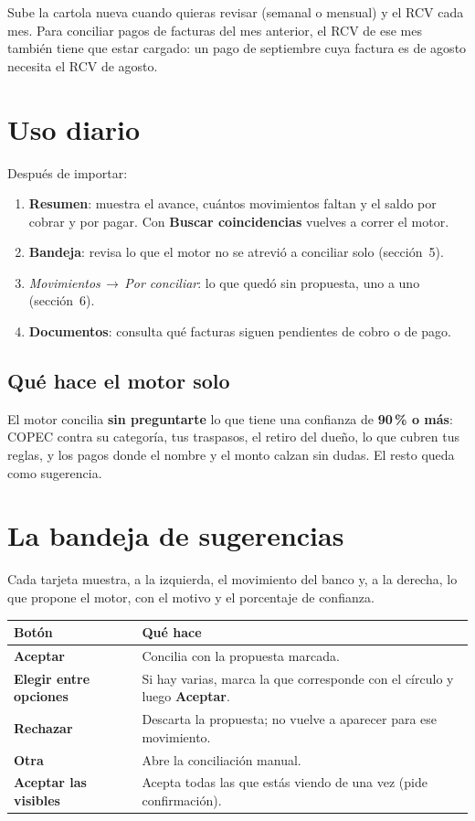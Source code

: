 \documentclass[11pt,a4paper]{article}
\newcommand{\ui}[1]{\textsf{\textbf{#1}}}                       %
\newcommand{\ruta}[1]{\textsf{\textit{#1}}}                      %
\newcommand{\flecha}{\,$\rightarrow$\,}
\newcommand{\encabezado}[1]{\sffamily\bfseries #1}
\begin{document}
\begin{nota}
Sube la cartola nueva cuando quieras revisar (semanal o mensual) y el RCV cada mes. Para conciliar pagos de facturas del mes anterior, el RCV de ese mes también tiene que estar cargado: un pago de septiembre cuya factura es de agosto necesita el RCV de agosto.
\end{nota}

\section{Uso diario}

Después de importar:

\begin{enumerate}
\item \ui{Resumen}: muestra el avance, cuántos movimientos faltan y el saldo por cobrar y por pagar. Con \ui{Buscar coincidencias} vuelves a correr el motor.
\item \ui{Bandeja}: revisa lo que el motor no se atrevió a conciliar solo (sección~5).
\item \ruta{Movimientos\flecha Por conciliar}: lo que quedó sin propuesta, uno a uno (sección~6).
\item \ui{Documentos}: consulta qué facturas siguen pendientes de cobro o de pago.
\end{enumerate}

\subsection*{Qué hace el motor solo}
El motor concilia \textbf{sin preguntarte} lo que tiene una confianza de \textbf{90\,\% o más}: COPEC contra su categoría, tus traspasos, el retiro del dueño, lo que cubren tus reglas, y los pagos donde el nombre y el monto calzan sin dudas. El resto queda como sugerencia.

\section{La bandeja de sugerencias}

Cada tarjeta muestra, a la izquierda, el movimiento del banco y, a la derecha, lo que propone el motor, con el motivo y el porcentaje de confianza.

\begin{tabularx}{\textwidth}{@{}>{\sffamily\bfseries}p{4cm}Y@{}}
\toprule
{}\encabezado{Botón} & \encabezado{Qué hace}\\
\midrule
Aceptar & Concilia con la propuesta marcada.\\
Elegir entre opciones & Si hay varias, marca la que corresponde con el círculo y luego \ui{Aceptar}.\\
Rechazar & Descarta la propuesta; no vuelve a aparecer para ese movimiento.\\
Otra & Abre la conciliación manual.\\
Aceptar las visibles & Acepta todas las que estás viendo de una vez (pide confirmación).\\
\bottomrule
\end{tabularx}
\end{document}
